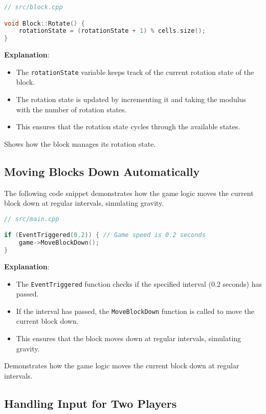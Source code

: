 \documentclass{article}
\begin{document}
\begin{lstlisting}[language=C++]
// src/block.cpp

void Block::Rotate() {
    rotationState = (rotationState + 1) % cells.size();
}
\end{lstlisting}

\textbf{Explanation}:

\begin{itemize}
    \item The \texttt{rotationState} variable keeps track of the current rotation state of the block.
    \item The rotation state is updated by incrementing it and taking the modulus with the number of rotation states.
    \item This ensures that the rotation state cycles through the available states.
\end{itemize}

Shows how the block manages its rotation state.

\subsection{Moving Blocks Down Automatically}

The following code snippet demonstrates how the game logic moves the current block down at regular intervals, simulating gravity.

\begin{lstlisting}[language=C++]
// src/main.cpp

if (EventTriggered(0.2)) { // Game speed is 0.2 seconds
    game->MoveBlockDown();
}
\end{lstlisting}

\textbf{Explanation}:

\begin{itemize}
    \item The \texttt{EventTriggered} function checks if the specified interval (0.2 seconds) has passed.
    \item If the interval has passed, the \texttt{MoveBlockDown} function is called to move the current block down.
    \item This ensures that the block moves down at regular intervals, simulating gravity.
\end{itemize}

Demonstrates how the game logic moves the current block down at regular intervals.

\subsection{Handling Input for Two Players}
\end{document}

